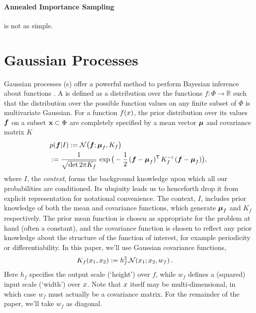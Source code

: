 \documentclass{article}
\begin{document}
\paragraph*{Annealed Importance Sampling} is not as simple.
\citep{neal2001annealed}

\section{Gaussian Processes}
Gaussian processes (\gp s) offer a powerful method to perform Bayesian
inference about functions \citep{GPsBook}. A \gpb is defined as a
distribution over the functions $f: \Phi \rightarrow \mathbb{R}$ such
that the distribution over the possible function values on any finite
subset of $\Phi$ is multivariate Gaussian.  For a function $f(\lfv)$,
the prior distribution over its values $\vf$ on a subset
$\vlfv \subset \Phi$ are completely specified by a mean vector
$\vmu$ and covariance matrix $K$
\begin{align*}%
\textstyle
 &\p{\vf}{I} \deq \N{\vf}{\vmu_{f}}{K_{f}}\\
 &\deq\frac{1}{\sqrt{\det{2\pi K_{f}}}}\,\exp \big(-\frac{1}{2}\,(\vf-\vmu_{f})\tra\,K_{f}\inv\,(\vf-\vmu_{f})\big),
\end{align*}
where $I$, the \emph{context}, forms the background knowledge upon which all our probabilities are conditioned. Its ubqiuity leads us to henceforth drop it from explicit representation for notational convenience. The context, $I$, includes prior knowledge of both the
mean and covariance functions, which generate $\vmu_{f}$ and
$K_{f}$ respectively. The prior mean function is chosen as
appropriate for the problem at hand (often a constant), and the
covariance function is chosen to reflect any prior knowledge about the
structure of the function of interest, for example periodicity or
differentiability. In this paper, we'll use Gaussian
covariance functions,
\begin{align} \label{eq:Gaussian_cov_fn}
\textstyle
K_{f}(\lfv_1,\lfv_2)& \deq h_f^2\,\N{\lfv_1}{\lfv_2}{w_{f}}.
\end{align} 
Here $h_f$ specifies the output scale (`height') over $f$, while $w_f$ defines a (squared) input scale (`width') over $\lfv$. Note that $\lfv$ itself may be multi-dimensional, in which case $w_f$ must actually be a covariance matrix. For the remainder of the paper, we'll take $w_f$ as diagonal. 
\end{document}
